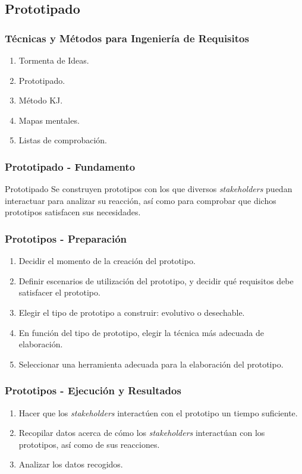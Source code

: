 ﻿\documentclass[handout,a4paper,slidestop,xcolor=pst,dvips,blue]{beamer}
\begin{document}
\subsection{Prototipado}

\begin{frame}[c]
    \frametitle{Técnicas y Métodos para Ingeniería de Requisitos}
    \begin{enumerate}
         \item Tormenta de Ideas.
         \item \alert{Prototipado}.
         \item Método KJ.
         \item Mapas mentales.
         \item Listas de comprobación.
    \end{enumerate}
\end{frame}

\begin{frame}[t]
    \frametitle{Prototipado - Fundamento}
    \begin{block}{Prototipado}
        Se construyen prototipos con los que diversos \emph{stakeholders} puedan interactuar para analizar su reacción, así como para comprobar que dichos prototipos satisfacen sus necesidades.
    \end{block}
\end{frame}

\begin{frame}[c]
    \frametitle{Prototipos - Preparación}
    \begin{enumerate}[<+->]
        \item Decidir el momento de la creación del prototipo.
        \item Definir escenarios de utilización del prototipo, y decidir qué requisitos debe satisfacer el prototipo.
        \item Elegir el tipo de prototipo a construir: evolutivo o desechable.
        \item En función del tipo de prototipo, elegir la técnica más adecuada de elaboración.
        \item Seleccionar una herramienta adecuada para la elaboración del prototipo.
    \end{enumerate}
\end{frame}

\begin{frame}[c]
    \frametitle{Prototipos - Ejecución y Resultados}
    \begin{enumerate}[<+->]
        \item Hacer que los \emph{stakeholders} interactúen con el prototipo un tiempo suficiente.
        \item Recopilar datos acerca de cómo los \emph{stakeholders} interactúan con los prototipos, así como de sus reacciones.
        \item Analizar los datos recogidos.
    \end{enumerate}
\end{frame}
\end{document}
